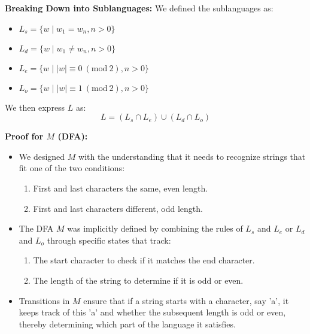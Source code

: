 \documentclass[a4paper]{article}
\begin{document}
\begin{enumerate}
\begin{enumerate}
            \textbf{Breaking Down into Sublanguages:}
            We defined the sublanguages as:
            \begin{itemize}
                \item $L_s = \{ w \mid w_1 = w_n, n > 0 \}$
                \item $L_d = \{ w \mid w_1 \neq w_n, n > 0 \}$
                \item $L_e = \{ w \mid |w| \equiv 0 \ (\text{mod}\ 2), n > 0 \}$
                \item $L_o = \{ w \mid |w| \equiv 1 \ (\text{mod}\ 2), n > 0 \}$ \\
            \end{itemize}

            We then express $L$ as:
            \[ L = (L_s \cap L_e) \cup (L_d \cap L_o) \]

            \textbf{Proof for $M$ (DFA):}
            \begin{itemize}
                \item We designed $M$ with the understanding that it needs to recognize strings that fit one of the two conditions:
                \begin{enumerate}
                    \item First and last characters the same, even length.
                    \item First and last characters different, odd length. \\
                \end{enumerate}
                \item The DFA $M$ was implicitly defined by combining the rules of $L_s$ and $L_e$ or $L_d$ and $L_o$ through specific states that track:
                \begin{enumerate}
                    \item The start character to check if it matches the end character.
                    \item The length of the string to determine if it is odd or even. \\
                \end{enumerate}
                \item Transitions in $M$ ensure that if a string starts with a character, say 'a', it keeps track of this 'a' and whether the subsequent length is odd or even, thereby determining which part of the language it satisfies. \\
            \end{itemize}


\end{enumerate}
\end{enumerate}
\end{document}
